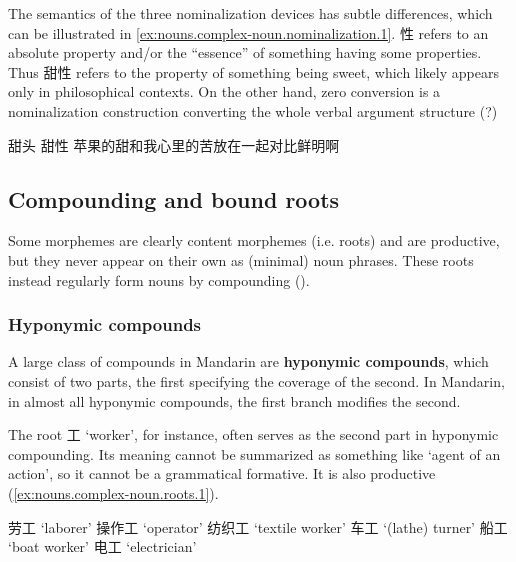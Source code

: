 \documentclass[UTF8, a4paper, oneside, scheme=plain, 12pt]{ctexrep}
\newcommand*{\concept}[1]{\textbf{#1}}
\newcommand{\translate}[1]{`#1'}
\begin{document}
The semantics of the three nominalization devices has subtle differences,
which can be illustrated in \ref{ex:nouns.complex-noun.nominalization.1}.
性 refers to an absolute property and/or the ``essence'' of something having some properties.
Thus 甜性 refers to the property of something being sweet,
which likely appears only in philosophical contexts.
On the other hand, zero conversion is a nominalization construction converting the whole verbal argument structure (?)

\begin{exe}
    \ex\label{ex:nouns.complex-noun.nominalization.1} \begin{xlist}
        \ex 甜头
        \ex 甜性
        \ex 苹果的甜和我心里的苦放在一起对比鲜明啊
    \end{xlist}
\end{exe}

\subsection{Compounding and bound roots}\label{sec:nouns.complex-noun.roots}

Some morphemes are clearly content morphemes (i.e. roots) and are productive,
but they never appear on their own as (minimal) noun phrases.
These roots instead regularly form nouns by compounding ().

\subsubsection{Hyponymic compounds}\label{sec:nouns.complex-noun.modification}

A large class of compounds in Mandarin are \concept{hyponymic compounds},
which consist of two parts, the first specifying the coverage of the second.
In Mandarin, in almost all hyponymic compounds,
the first branch modifies the second.

The root 工 \translate{worker}, for instance, often serves as the second part in hyponymic compounding.
Its meaning cannot be summarized as something like \translate{agent of an action},
so it cannot be a grammatical formative.
It is also productive (\ref{ex:nouns.complex-noun.roots.1}).

\begin{exe}
    \ex\label{ex:nouns.complex-noun.roots.1} \begin{xlist}
        \ex 劳工 \translate{laborer} 
        \ex 操作工 \translate{operator}
        \ex 纺织工 \translate{textile worker}
        \ex 车工 \translate{(lathe) turner}
        \ex 船工 \translate{boat worker}
        \ex 电工 \translate{electrician}
    \end{xlist}
\end{exe}
\end{document}
